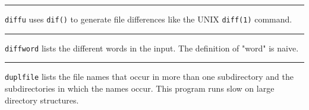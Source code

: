 {{{{{\vspace{0.25cm}\hrule{}

\texttt{diffu} uses \texttt{dif()} to generate file
differences like the UNIX \texttt{diff(1)} command.

\vspace{0.25cm}\hrule{}

\texttt{diffword} lists the different words in the input. The
definition of "word" is naive. 



\vspace{0.25cm}\hrule{}

\texttt{duplfile} lists the file names that occur in more than one
subdirectory and the subdirectories in which the names occur. This
program runs slow on large directory structures.



}}}}}

